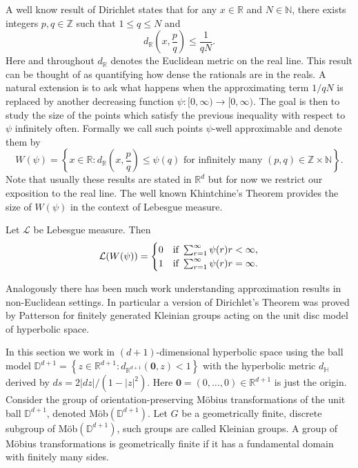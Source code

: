 A well know result of Dirichlet states that for any $x \in \mathbb{R}$ and $N \in \mathbb{N}$, there exists integers $p, q \in \mathbb{Z}$ such that $1 \le q \le N $ and 
\[
d_{\mathbb{R}}\left( x , \frac{p}{q} \right) \le \frac{1}{qN}.
\]
Here and throughout $d_{\mathbb{R}}$ denotes the Euclidean metric on the real line. This result can be thought of as quantifying how dense the rationals are in the reals. A natural extension is to ask what happens when the approximating term $1/qN$ is replaced by another decreasing function $\psi \colon [0,\infty) \rightarrow [0,\infty)$. The goal is then to study the size of the points which satisfy the previous inequality with respect to $\psi$ infinitely often. Formally we call such points $\psi$-well approximable and denote them by 
\[
W(\psi) = \left\{x \in \mathbb{R} \colon d_{\mathbb{R}}\left( x , \frac{p}{q} \right) \le \psi(q) \text{ for infinitely many } (p,q) \in \mathbb{Z} \times \mathbb{N}  \right\}.
\]
Note that usually these results are stated in $\mathbb{R}^d$ but for now we restrict our exposition to the real line. The well known Khintchine's Theorem provides the size of $W(\psi)$ in the context of Lebesgue measure.
\begin{theorem}
    Let $\mathcal{L}$ be Lebesgue measure. Then
    \[
    \mathcal{L}(W(\psi)) = \begin{cases} 
      0 & \textup{if }   \sum_{r=1}^{\infty}\psi(r)r < \infty, \\
      1 & \textup{if }   \sum_{r=1}^{\infty}\psi(r)r = \infty.
   \end{cases}
    \]
\end{theorem}

Analogously there has been much work understanding approximation results in non-Euclidean settings. In particular a version of Dirichlet's Theorem was proved by Patterson \cite{patterson} for finitely generated Kleinian groups acting on the unit disc model of hyperbolic space. 

In this section we work in $(d+1)$-dimensional hyperbolic space using the ball model $\mathbb{D}^{d+1} = \left\{ z \in \mathbb{R}^{d+1} \colon d_{\mathbb{R}^{d+1}}(\mathbf{0},z) < 1 \right\}$ with the hyperbolic metric $d_{\mathbb{H}}$ derived by $ds = 2 \lvert dz \rvert / (1 - \lvert z \rvert^2)$. Here $\mathbf{0} = (0,\ldots, 0) \in \mathbb{R}^{d+1}$ is just the origin. Consider the group of orientation-preserving M{\"o}bius transformations of the unit ball $\mathbb{D}^{d+1}$, denoted M{\"o}b$(\mathbb{D}^{d+1})$. Let $G$ be a geometrically finite, discrete subgroup of M{\"o}b$(\mathbb{D}^{d+1})$, such groups are called Kleinian groups. A group of M{\"o}bius transformations is geometrically finite if it has a fundamental domain with finitely many sides. 

